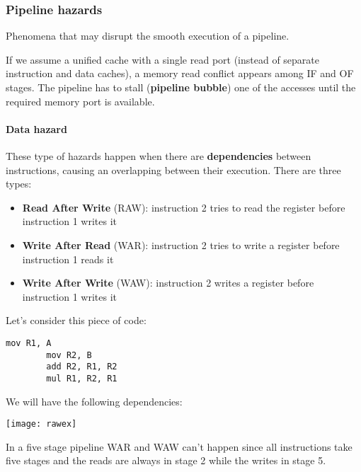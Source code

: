 \subsubsection{Pipeline hazards}
\begin{definition}
	Phenomena that may disrupt the smooth execution of a pipeline.
\end{definition}

\begin{example}
	If we assume a unified cache with a single read port (instead of separate instruction and data caches), a memory read conflict appears among IF and OF stages. The pipeline has to stall (\textbf{pipeline bubble}) one of the accesses until the required memory port is available.
\end{example}

\hfill

\paragraph{Data hazard} These type of hazards happen when there are \textbf{dependencies} between instructions, causing an overlapping between their execution. There are three types:
\begin{itemize}
	\item \textbf{Read After Write} (RAW): instruction 2 tries to read the register before instruction 1 writes it
	\item \textbf{Write After Read} (WAR): instruction 2 tries to write a register before instruction 1 reads it
	\item \textbf{Write After Write} (WAW): instruction 2 writes a register before instruction 1 writes it
\end{itemize}

\begin{example}
	Let's consider this piece of code:
	\begin{lstlisting}[language={[x86masm]Assembler}]
		mov R1, A
		mov R2, B
		add R2, R1, R2
		mul R1, R2, R1
	\end{lstlisting}
	We will have the following dependencies:
	\begin{center}
		\texttt{[image: rawex]}
	\end{center}
\end{example}

\begin{observation}
	In a five stage pipeline WAR and WAW can't happen since all instructions take five stages and the reads are always in stage 2 while the writes in stage 5.
\end{observation}

